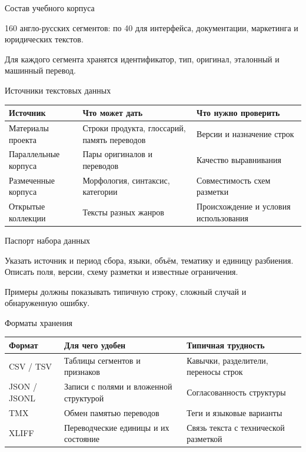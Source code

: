 \documentclass[aspectratio=169,12pt]{beamer}
\begin{document}
\begin{frame}{Состав учебного корпуса}
\color{ink}
{\small 160 англо-русских сегментов: по 40 для интерфейса, документации, маркетинга и юридических текстов.
\par\vspace{0.6em}Для каждого сегмента хранятся идентификатор, тип, оригинал, эталонный и машинный перевод.}
\end{frame}

\begin{frame}{Источники текстовых данных}
\color{ink}
{\small\renewcommand{\arraystretch}{1.15}\begin{tabular}{@{}Л{0.25} Л{0.35} Л{0.32}@{}}\toprule
Источник & Что может дать & Что нужно проверить\\\midrule
Материалы проекта & Строки продукта, глоссарий, память переводов & Версии и назначение строк\\[0.15em]
Параллельные корпуса & Пары оригиналов и переводов & Качество выравнивания\\[0.15em]
Размеченные корпуса & Морфология, синтаксис, категории & Совместимость схем разметки\\[0.15em]
Открытые коллекции & Тексты разных жанров & Происхождение и условия использования\\[0.15em]\bottomrule\end{tabular}}
\end{frame}

\begin{frame}{Паспорт набора данных}
\color{ink}
{\small Указать источник и период сбора, языки, объём, тематику и единицу разбиения. Описать поля, версии, схему разметки и известные ограничения.
\par\vspace{0.6em}Примеры должны показывать типичную строку, сложный случай и обнаруженную ошибку.}
\end{frame}

\begin{frame}{Форматы хранения}
\color{ink}
{\small\renewcommand{\arraystretch}{1.15}\begin{tabular}{@{}Л{0.22} Л{0.39} Л{0.31}@{}}\toprule
Формат & Для чего удобен & Типичная трудность\\\midrule
CSV / TSV & Таблицы сегментов и признаков & Кавычки, разделители, переносы строк\\[0.15em]
JSON / JSONL & Записи с полями и вложенной структурой & Согласованность структуры\\[0.15em]
TMX & Обмен памятью переводов & Теги и языковые варианты\\[0.15em]
XLIFF & Переводческие единицы и их состояние & Связь текста с технической разметкой\\[0.15em]\bottomrule\end{tabular}}
\end{frame}
\end{document}
